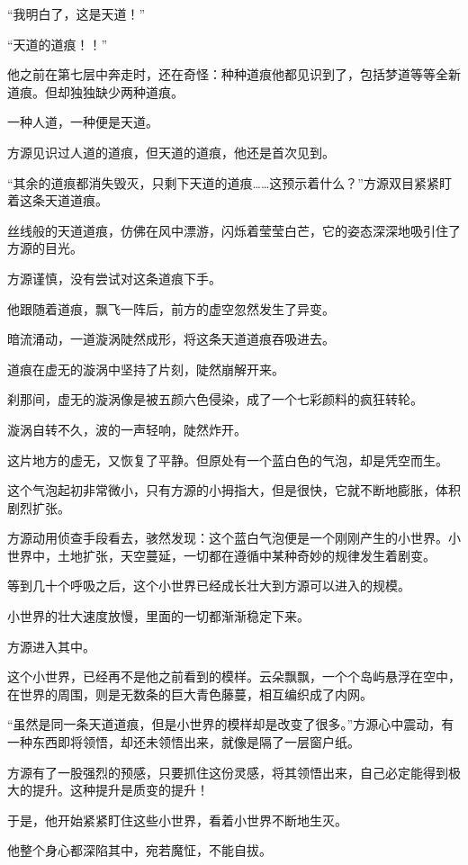 \begin{this_body}
“我明白了，这是天道！”

“天道的道痕！！”

他之前在第七层中奔走时，还在奇怪：种种道痕他都见识到了，包括梦道等等全新道痕。但却独独缺少两种道痕。

一种人道，一种便是天道。

方源见识过人道的道痕，但天道的道痕，他还是首次见到。

“其余的道痕都消失毁灭，只剩下天道的道痕……这预示着什么？”方源双目紧紧盯着这条天道道痕。

丝线般的天道道痕，仿佛在风中漂游，闪烁着莹莹白芒，它的姿态深深地吸引住了方源的目光。

方源谨慎，没有尝试对这条道痕下手。

他跟随着道痕，飘飞一阵后，前方的虚空忽然发生了异变。

暗流涌动，一道漩涡陡然成形，将这条天道道痕吞吸进去。

道痕在虚无的漩涡中坚持了片刻，陡然崩解开来。

刹那间，虚无的漩涡像是被五颜六色侵染，成了一个七彩颜料的疯狂转轮。

漩涡自转不久，波的一声轻响，陡然炸开。

这片地方的虚无，又恢复了平静。但原处有一个蓝白色的气泡，却是凭空而生。

这个气泡起初非常微小，只有方源的小拇指大，但是很快，它就不断地膨胀，体积剧烈扩张。

方源动用侦查手段看去，骇然发现：这个蓝白气泡便是一个刚刚产生的小世界。小世界中，土地扩张，天空蔓延，一切都在遵循中某种奇妙的规律发生着剧变。

等到几十个呼吸之后，这个小世界已经成长壮大到方源可以进入的规模。

小世界的壮大速度放慢，里面的一切都渐渐稳定下来。

方源进入其中。

这个小世界，已经再不是他之前看到的模样。云朵飘飘，一个个岛屿悬浮在空中，在世界的周围，则是无数条的巨大青色藤蔓，相互编织成了内网。

“虽然是同一条天道道痕，但是小世界的模样却是改变了很多。”方源心中震动，有一种东西即将领悟，却还未领悟出来，就像是隔了一层窗户纸。

方源有了一股强烈的预感，只要抓住这份灵感，将其领悟出来，自己必定能得到极大的提升。这种提升是质变的提升！

于是，他开始紧紧盯住这些小世界，看着小世界不断地生灭。

他整个身心都深陷其中，宛若魔怔，不能自拔。


\end{this_body}
